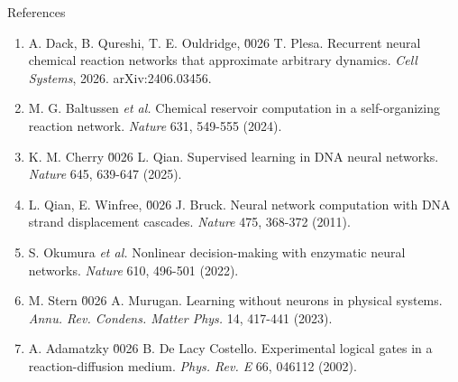 \documentclass[aspectratio=169,11pt]{beamer}
\begin{document}
\begin{frame}{References}

{\footnotesize
\begin{enumerate}
    \item A. Dack, B. Qureshi, T. E. Ouldridge, \u0026 T. Plesa. Recurrent neural chemical reaction networks that approximate arbitrary dynamics. \textit{Cell Systems}, 2026. arXiv:2406.03456.

    \item M. G. Baltussen \textit{et al.} Chemical reservoir computation in a self-organizing reaction network. \textit{Nature} 631, 549-555 (2024).

    \item K. M. Cherry \u0026 L. Qian. Supervised learning in DNA neural networks. \textit{Nature} 645, 639-647 (2025).

    \item L. Qian, E. Winfree, \u0026 J. Bruck. Neural network computation with DNA strand displacement cascades. \textit{Nature} 475, 368-372 (2011).

    \item S. Okumura \textit{et al.} Nonlinear decision-making with enzymatic neural networks. \textit{Nature} 610, 496-501 (2022).

    \item M. Stern \u0026 A. Murugan. Learning without neurons in physical systems. \textit{Annu. Rev. Condens. Matter Phys.} 14, 417-441 (2023).

    \item A. Adamatzky \u0026 B. De Lacy Costello. Experimental logical gates in a reaction-diffusion medium. \textit{Phys. Rev. E} 66, 046112 (2002).
\end{enumerate}
}

\end{frame}
\end{document}
